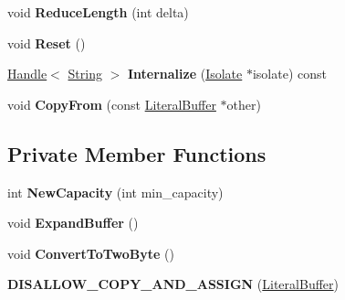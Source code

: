 \begin{DoxyCompactItemize}
\item 
void {\bfseries Reduce\+Length} (int delta)\hypertarget{classv8_1_1internal_1_1_literal_buffer_ab9e0421c276834c0d08c6c08b5b7ce05}{}\label{classv8_1_1internal_1_1_literal_buffer_ab9e0421c276834c0d08c6c08b5b7ce05}

\item 
void {\bfseries Reset} ()\hypertarget{classv8_1_1internal_1_1_literal_buffer_a35d8f9cff691032239ecde09cac7f807}{}\label{classv8_1_1internal_1_1_literal_buffer_a35d8f9cff691032239ecde09cac7f807}

\item 
\hyperlink{classv8_1_1internal_1_1_handle}{Handle}$<$ \hyperlink{classv8_1_1internal_1_1_string}{String} $>$ {\bfseries Internalize} (\hyperlink{classv8_1_1internal_1_1_isolate}{Isolate} $\ast$isolate) const \hypertarget{classv8_1_1internal_1_1_literal_buffer_a1e8153a6fcbd5dcd3286f4a0539cd813}{}\label{classv8_1_1internal_1_1_literal_buffer_a1e8153a6fcbd5dcd3286f4a0539cd813}

\item 
void {\bfseries Copy\+From} (const \hyperlink{classv8_1_1internal_1_1_literal_buffer}{Literal\+Buffer} $\ast$other)\hypertarget{classv8_1_1internal_1_1_literal_buffer_abe7c3d9175ed68469ed39778186880d5}{}\label{classv8_1_1internal_1_1_literal_buffer_abe7c3d9175ed68469ed39778186880d5}

\end{DoxyCompactItemize}
\subsection*{Private Member Functions}
\begin{DoxyCompactItemize}
\item 
int {\bfseries New\+Capacity} (int min\+\_\+capacity)\hypertarget{classv8_1_1internal_1_1_literal_buffer_af0c2c15f74513f48af5a629c41d7d57f}{}\label{classv8_1_1internal_1_1_literal_buffer_af0c2c15f74513f48af5a629c41d7d57f}

\item 
void {\bfseries Expand\+Buffer} ()\hypertarget{classv8_1_1internal_1_1_literal_buffer_a8b1fbbf52a07de1c1761bd63b407758e}{}\label{classv8_1_1internal_1_1_literal_buffer_a8b1fbbf52a07de1c1761bd63b407758e}

\item 
void {\bfseries Convert\+To\+Two\+Byte} ()\hypertarget{classv8_1_1internal_1_1_literal_buffer_a859abdebbe4581c8b3b7f01c66694809}{}\label{classv8_1_1internal_1_1_literal_buffer_a859abdebbe4581c8b3b7f01c66694809}

\item 
{\bfseries D\+I\+S\+A\+L\+L\+O\+W\+\_\+\+C\+O\+P\+Y\+\_\+\+A\+N\+D\+\_\+\+A\+S\+S\+I\+GN} (\hyperlink{classv8_1_1internal_1_1_literal_buffer}{Literal\+Buffer})\hypertarget{classv8_1_1internal_1_1_literal_buffer_ade4f561055887e60fd8f269befa19afb}{}\label{classv8_1_1internal_1_1_literal_buffer_ade4f561055887e60fd8f269befa19afb}

\end{DoxyCompactItemize}
